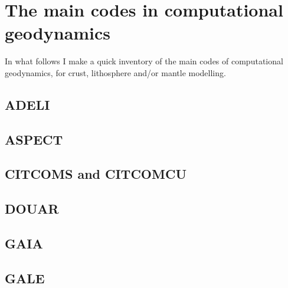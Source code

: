 \documentclass[a4paper]{article}
\begin{document}


\appendix

\newpage
\section{The main codes in computational geodynamics}

In what follows I make a quick inventory of the main codes of computational geodynamics, 
for crust, lithosphere and/or mantle modelling.

\subsection{ADELI}

\subsection{ASPECT}

\subsection{CITCOMS and CITCOMCU}

\subsection{DOUAR}

\subsection{GAIA}

\subsection{GALE}
\end{document}
